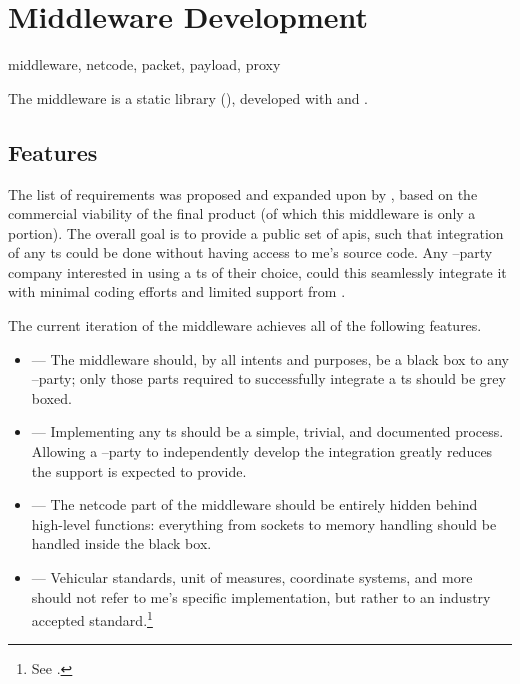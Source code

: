 \chapter{Middleware Development}\label{ch:middleware}

\begin{keywords}
	middleware, netcode, packet, payload, proxy
\end{keywords}

The \gls{middleware} is a  static library (), developed with  and .

\section{Features}\label{sc:middleware:features}

The list of requirements was proposed and expanded upon by , based on the commercial viability of the final product (of which this \gls{middleware} is only a portion). The overall goal is to provide a public set of \glspl{api}, such that integration of any \gls{ts} could be done without having access to \gls{me}'s source code. Any --party company interested in using a \gls{ts} of their choice, could this seamlessly integrate it with minimal coding efforts and limited support from .

The current iteration of the \gls{middleware} achieves all of the following \glspl{feature}.

\begin{itemize}
	\item {} --- The \gls{middleware} should, by all intents and purposes, be a black box to any --party; only those parts required to successfully integrate a \gls{ts} should be grey boxed.
	\item {} --- Implementing any \gls{ts} should be a simple, trivial, and documented process. Allowing a --party to independently develop the integration greatly reduces the support  is expected to provide.
	\item {} --- The \gls{netcode} part of the \gls{middleware} should be entirely hidden behind high-level functions: everything from sockets to memory handling should be handled inside the black box.
	\item {} --- Vehicular standards, unit of measures, coordinate systems, and more should not refer to \gls{me}'s specific implementation, but rather to an industry accepted standard.\footnote{See .}
\end{itemize}

